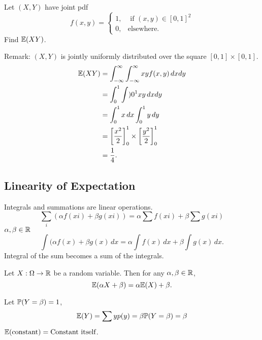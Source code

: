 \documentclass[10pt, a4paper]{article}
\begin{document}
\begin{example}
    Let $(X, Y)$ have joint pdf
    \[
    f(x, y) = \begin{cases}
        1, &\text{ if $(x, y) \in [0, 1] ^ 2$} \\
        0, &\text{elsewhere}.
    \end{cases}
    \]
    Find $\E(XY)$.

    Remark:
    $(X, Y)$ is jointly uniformly distributed over the square $[0, 1] \times [0, 1]$.
    \begin{align*}
        \E(XY) &= \int_{-\infty}^{\infty}\int_{-\infty}^{\infty}xyf(x, y)\,dxdy \\
        &= \int_{0}^{1}\int){0}^{1}xy\,dxdy \\
        &= \int_{0}^{1}x\,dx\int_{0}^{1}y\,dy \\
        &= \left[\frac{x ^ 2}{2}\right]_{0}^{1} \times \left[\frac{y ^ 2}{2}\right]_{0}^{1} \\
        &= \frac{1}{4}.
    \end{align*}
\end{example}

\subsection{Linearity of Expectation}
Integrals and summations are linear operations.
\[
\sum_{i}(\alpha f(xi) + \beta g(xi)) = \alpha\sum f(xi) + \beta\sum g(xi)
\]
$\alpha, \beta \in \R$
\[
\int(\alpha f(x) + \beta g(x)\,dx = \alpha\int f(x)\,dx + \beta\int g(x)\,dx.
\]
Integral of the sum becomes a sum of the integrals.

\begin{theorem}[Linearity]
    Let $X : \Omega \rightarrow \R$ be a random variable.
    Then for any $\alpha, \beta \in \R$,
    \[
    \E(\alpha X + \beta) = \alpha\E(X) + \beta.
    \]
\end{theorem}

\begin{remark}
    Let $\P(Y = \beta) = 1$,
    \[
    \E(Y) = \sum yp(y) = \beta \P(Y = \beta) = \beta
    \]
    $\E(\text{constant}) = \text{Constant itself}$.
\end{remark}
\end{document}
